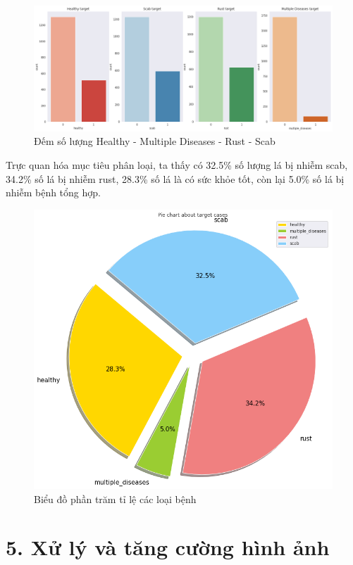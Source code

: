 \documentclass{article}
\begin{document}
	\begin{figure}[H]
		\centering
		\includegraphics[width=1\linewidth]{images/counting_plot_target.png}
		\caption{Đếm số lượng Healthy - Multiple Diseases - Rust - Scab}
		\label{fig:writing-thesis}
	\end{figure}
	Trực quan hóa mục tiêu phân loại, ta thấy có 32.5\% số lượng lá bị nhiễm scab, 34.2\% số lá bị nhiễm rust, 28.3\% số lá là có sức khỏe tốt, còn lại 5.0\% số lá bị nhiễm bệnh tổng hợp.
	\begin{figure}[H]
		\centering
		\includegraphics[width=.75\linewidth]{images/pie_chart_targer_plot.png}
		\caption{Biểu đồ phần trăm tỉ lệ các loại bệnh}
		\label{fig:writing-thesis}
	\end{figure}
	\section{5. Xử lý và tăng cường hình ảnh}
\end{document}
